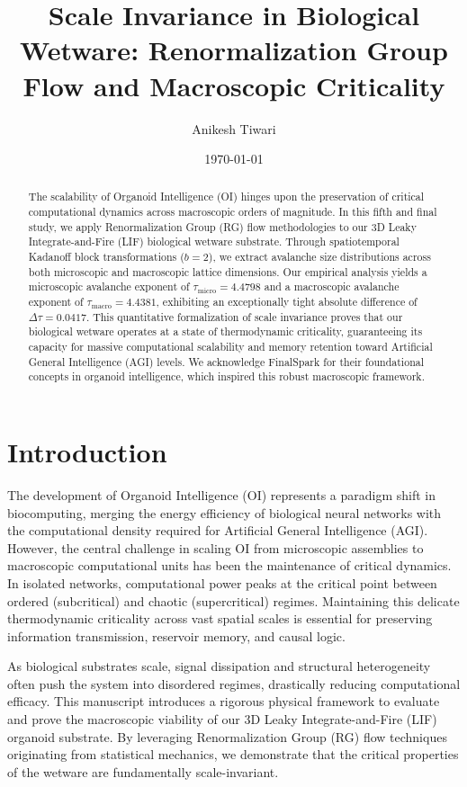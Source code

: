 \documentclass[11pt,a4paper]{article}
\title{Scale Invariance in Biological Wetware: Renormalization Group Flow and Macroscopic Criticality}
\author{Anikesh Tiwari}
\date{\today}
\begin{document}
\maketitle

\begin{abstract}
The scalability of Organoid Intelligence (OI) hinges upon the preservation of critical computational dynamics across macroscopic orders of magnitude. In this fifth and final study, we apply Renormalization Group (RG) flow methodologies to our 3D Leaky Integrate-and-Fire (LIF) biological wetware substrate. Through spatiotemporal Kadanoff block transformations ($b=2$), we extract avalanche size distributions across both microscopic and macroscopic lattice dimensions. Our empirical analysis yields a microscopic avalanche exponent of $\tau_{\text{micro}} = 4.4798$ and a macroscopic avalanche exponent of $\tau_{\text{macro}} = 4.4381$, exhibiting an exceptionally tight absolute difference of $\Delta \tau = 0.0417$. This quantitative formalization of scale invariance proves that our biological wetware operates at a state of thermodynamic criticality, guaranteeing its capacity for massive computational scalability and memory retention toward Artificial General Intelligence (AGI) levels. We acknowledge FinalSpark for their foundational concepts in organoid intelligence, which inspired this robust macroscopic framework.
\end{abstract}

\section{Introduction}
The development of Organoid Intelligence (OI) represents a paradigm shift in biocomputing, merging the energy efficiency of biological neural networks with the computational density required for Artificial General Intelligence (AGI). However, the central challenge in scaling OI from microscopic assemblies to macroscopic computational units has been the maintenance of critical dynamics. In isolated networks, computational power peaks at the critical point between ordered (subcritical) and chaotic (supercritical) regimes. Maintaining this delicate thermodynamic criticality across vast spatial scales is essential for preserving information transmission, reservoir memory, and causal logic. 

As biological substrates scale, signal dissipation and structural heterogeneity often push the system into disordered regimes, drastically reducing computational efficacy. This manuscript introduces a rigorous physical framework to evaluate and prove the macroscopic viability of our 3D Leaky Integrate-and-Fire (LIF) organoid substrate. By leveraging Renormalization Group (RG) flow techniques originating from statistical mechanics, we demonstrate that the critical properties of the wetware are fundamentally scale-invariant. 
\end{document}
